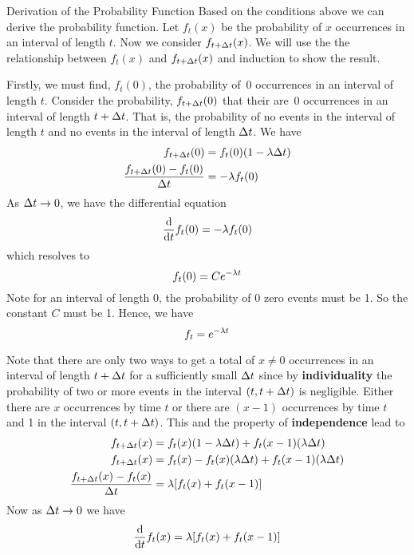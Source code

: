 \begin{theory}{Derivation of the Probability Function}
Based on the conditions above we can derive the probability function. Let $f_t(x)$ be the probability of $x$ occurrences in an interval of length $t$. Now we consider $f_{t + \Delta t}(x)$. We will use the the relationship between $f_t(x)$ and $f_{t + \Delta t}(x)$ and induction to show the result.
\par\smallskip
Firstly, we must find, $f_t(0)$, the probability of~0 occurrences in an interval of length $t$. Consider the probability, $f_{t + \Delta t}(0)$ that their are~0 occurrences in an interval of length $t + \Delta t$. That is, the probability of no events in the interval of length $t$ and no events in the interval of length $\Delta t$. We have
\begin{align*}
    f_{t+\Delta t}(0) &= f_t(0)(1 - \lambda \Delta t) \\
    \frac{f_{t+\Delta t}(0) - f_t(0)}{\Delta t} &= -\lambda f_t(0) \\
\end{align*}
As $\Delta t \rightarrow 0$, we have the differential equation
\[
    \frac{\operatorname{d}\!{}}{\operatorname{d}\!{t}} f_t(0) = -\lambda f_t(0)
\]
which resolves to
\[
    f_t(0) = Ce^{-\lambda t}
\]
Note for an interval of length 0, the probability of 0 zero events must be 1. So the constant $C$ must be 1. Hence, we have
\[
    f_t = e^{-\lambda t}
\]
\par\smallskip
Note that there are only two ways to get a total of $x \neq 0$ occurrences in an interval of length $t + \Delta t$ for a sufficiently small $\Delta t$ since by \textbf{individuality} the probability of two or more events in the interval $(t, t + \Delta t)$ is negligible. Either there are $x$ occurrences by time $t$ or there are $(x-1)$ occurrences by time $t$ and 1 in the interval $(t, t + \Delta t)$. This and the property of \textbf{independence} lead to
\begin{align*}
    f_{t + \Delta t}(x) &= f_t(x)(1 - \lambda \Delta t) + f_t(x - 1)(\lambda \Delta t) \\
    f_{t + \Delta t}(x) &= f_t(x) - f_t(x)(\lambda \Delta t) + f_t(x - 1)(\lambda \Delta t) \\
    \frac{f_{t + \Delta t}(x) - f_t(x)}{\Delta t} &= \lambda [f_t(x) + f_t(x-1)]
\end{align*}
Now as $\Delta t \rightarrow 0$ we have
\begin{align*}
    \frac{\operatorname{d}\!{}}{\operatorname{d}\!{t}} f_t(x) = \lambda [f_t(x) + f_t(x-1)]
\end{align*}
\end{theory}
